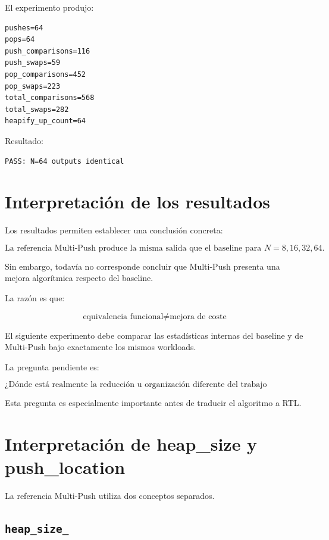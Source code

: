 \documentclass[11pt,a4paper]{article}
\begin{document}
El experimento produjo:

\begin{lstlisting}[style=textfile]
pushes=64
pops=64
push_comparisons=116
push_swaps=59
pop_comparisons=452
pop_swaps=223
total_comparisons=568
total_swaps=282
heapify_up_count=64
\end{lstlisting}

Resultado:

\begin{lstlisting}[style=textfile]
PASS: N=64 outputs identical
\end{lstlisting}

\section{Interpretación de los resultados}

Los resultados permiten establecer una conclusión concreta:

\[
\boxed{
\text{La referencia Multi-Push produce la misma salida que el baseline
para } N=8,16,32,64.
}
\]

Sin embargo, todavía no corresponde concluir que Multi-Push presenta una
mejora algorítmica respecto del baseline.

La razón es que:

\[
\text{equivalencia funcional}
\neq
\text{mejora de coste}
\]

El siguiente experimento debe comparar las estadísticas internas del
baseline y de Multi-Push bajo exactamente los mismos workloads.

La pregunta pendiente es:

\[
\boxed{
\text{¿Dónde está realmente la reducción u organización diferente
del trabajo producida por Multi-Push?}
}
\]

Esta pregunta es especialmente importante antes de traducir el algoritmo
a RTL.

\section{Interpretación de heap\_size y push\_location}

La referencia Multi-Push utiliza dos conceptos separados.

\subsection{\texttt{heap\_size\_}}
\end{document}
